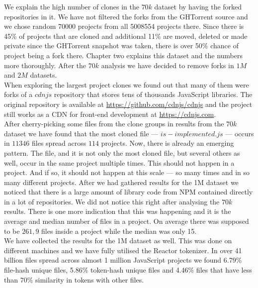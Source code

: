 \documentclass[thesis=M,english]{FITthesis}[2012/10/20]
\begin{document}
We explain the high number of clones in the $70k$ dataset by having the forked repositories in it. We have not filtered the forks from the GHTorrent source and we chose random 70000 projects from all 5008554 projects there. Since there is 45\% of projects that are cloned and additional 11\% are moved, deleted or made private since the GHTorrent snapshot was taken, there is over 50\% chance of project being a fork there. Chapter two explains this dataset and the numbers more thoroughly. After the $70k$ analysis we have decided to remove forks in $1M$ and $2M$ datasets.\\

When exploring the largest project clones we found out that many of them were forks of a $cdnjs$ repository that stores tens of thousands JavaScript libraries. The original repository is available at \url{https://github.com/cdnjs/cdnjs} and the project still works as a CDN for front-end development at \url{https://cdnjs.com}. \\

After cherry-picking some files from the clone groups in results from the $70k$ dataset we have found that the most cloned file — $is-implemented.js$ — occurs in $11346$ files spread across $114$ projects. Now, there is already an emerging pattern. The file, and it is not only the most cloned file, but several others as well, occur in the same project multiple times. This should not happen in a project. And if so, it should not happen at this scale — so many times and in so many different projects. After we had gathered results for the 1M dataset we noticed that there is a large amount of library code from NPM contained directly in a lot of repositories. We did not notice this right after analysing the $70k$ results. There is one more indication that this was happening and it is the average and median number of files in a project. On average there was supposed to be $261,9$ files inside a project while the median was only 15. \\

We have collected the results for the 1M dataset as well. This was done on different machines and we have fully utilised the Reactor tokenizer. In over 41 billion files spread across almost 1 million JavaScript projects we found 6.79\% file-hash unique files, 5.86\% token-hash unique files and 4.46\% files that have less than 70\% similarity in tokens with other files. \\
\end{document}
